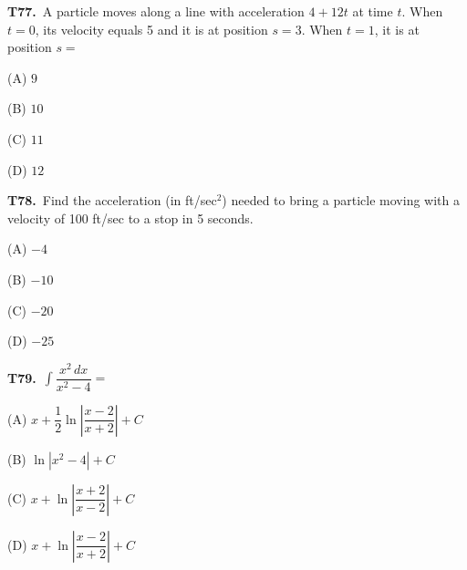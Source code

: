 \documentclass[11pt]{article}
\begin{document}
\bigskip\noindent\textbf{T77.}\ A particle moves along a line with acceleration $4+12t$ at time $t$. When $t=0$, its velocity equals 5 and it is at position $s=3$. When $t=1$, it is at position $s=$
\begin{list}{}{\setlength{\leftmargin}{3em}\setlength{\labelwidth}{2.5em}\setlength{\itemsep}{0pt}\setlength{\topsep}{2pt}}
\item[(A)] $9$
\item[(B)] $10$
\item[(C)] $11$
\item[(D)] $12$
\end{list}

\bigskip\noindent\textbf{T78.}\ Find the acceleration (in ft/sec$^2$) needed to bring a particle moving with a velocity of 100 ft/sec to a stop in 5 seconds.
\begin{list}{}{\setlength{\leftmargin}{3em}\setlength{\labelwidth}{2.5em}\setlength{\itemsep}{0pt}\setlength{\topsep}{2pt}}
\item[(A)] $-4$
\item[(B)] $-10$
\item[(C)] $-20$
\item[(D)] $-25$
\end{list}

\bigskip\noindent\textbf{T79.}\ $\displaystyle\int \dfrac{x^2\,dx}{x^2-4} =$
\begin{list}{}{\setlength{\leftmargin}{3em}\setlength{\labelwidth}{2.5em}\setlength{\itemsep}{0pt}\setlength{\topsep}{2pt}}
\item[(A)] $x+\dfrac{1}{2}\ln\left|\dfrac{x-2}{x+2}\right|+C$
\item[(B)] $\ln|x^2-4|+C$
\item[(C)] $x+\ln\left|\dfrac{x+2}{x-2}\right|+C$
\item[(D)] $x+\ln\left|\dfrac{x-2}{x+2}\right|+C$
\end{list}
\end{document}
